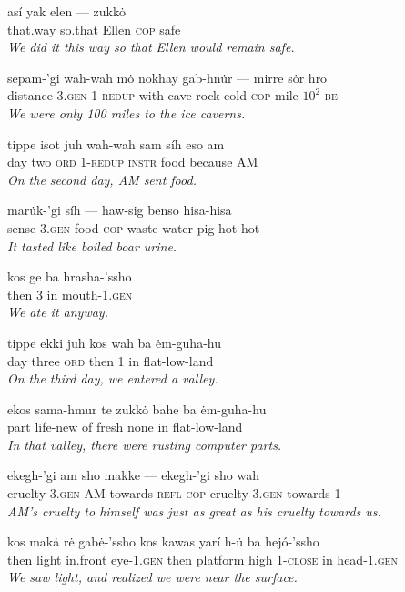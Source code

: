 \documentclass{article}[10pt]
\begin{document}
\begin{exe}
\ex
\gll as\'{i} yak elen --- zukk\.{o}\\
that.way so.that Ellen \textsc{cop} safe\\
\trans \emph{We did it this way so that Ellen would remain safe.}


\ex
\gll sepam-'gi wah-wah m\.{o} nokhay gab-hn\.{u}r --- mirre s\.{o}r hro\\
distance-3.\textsc{gen} 1-\textsc{redup} with cave rock-cold \textsc{cop} mile $10^2$ \textsc{be}\\
\trans \emph{We were only 100 miles to the ice caverns.}

\ex
\gll tippe isot juh wah-wah sam s\'{i}h eso am\\
day two \textsc{ord} 1-\textsc{redup} \textsc{instr} food because AM\\
\trans \emph{On the second day, AM sent food.}

\ex
\gll mar\.{u}k-'gi s\'{i}h --- haw-sig benso hisa-hisa\\
sense-3.\textsc{gen} food \textsc{cop} waste-water pig hot-hot\\
\trans \emph{It tasted like boiled boar urine.}

\ex
\gll kos ge ba hrasha-'ssho\\
then 3 in mouth-1.\textsc{gen}\\
\trans \emph{We ate it anyway.}


\ex
\gll tippe ekki juh kos wah ba \.{e}m-guha-hu\\
day three \textsc{ord} then 1 in flat-low-land\\
\trans \emph{On the third day, we entered a valley.}

\ex
\gll ekos sama-hmur te zukk\.{o} bahe ba \.{e}m-guha-hu\\
part life-new of fresh none in flat-low-land\\
\trans \emph{In that valley, there were rusting computer parts.}

\ex
\gll ekegh-'gi am sho makke --- ekegh-'gi sho wah\\
cruelty-3.\textsc{gen} AM towards \textsc{refl} \textsc{cop} cruelty-3.\textsc{gen} towards 1\\
\trans \emph{AM's cruelty to himself was just as great as his cruelty towards us.}

\ex
\gll kos mak\.{a} r\.{e} gab\.{e}-'ssho kos kawas yar\'{i} h-\.{u} ba hej\'{o}-'ssho\\
then light in.front eye-1.\textsc{gen} then platform high 1-\textsc{close} in head-1.\textsc{gen}\\
\trans \emph{We saw light, and realized we were near the surface.}


\end{exe}
\end{document}
